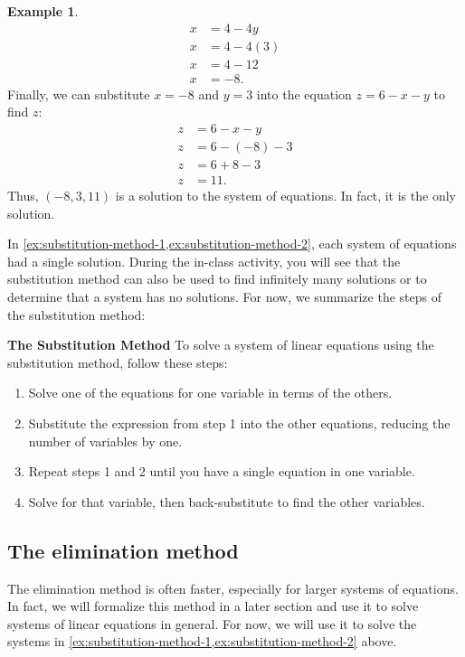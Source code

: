 \documentclass{article}
\theoremstyle{definition}
\newtheorem{example}{Example}
\newcounter{calloutbox}
\begin{document}
\begin{example}
\begin{align*}
    x&=4-4y \\
    x&=4-4(3) \\
    x&=4-12 \\
    x&=-8.
\end{align*}
Finally, we can substitute \(x=-8\) and \(y=3\) into the equation \(z=6-x-y\) to find \(z\):
\begin{align*}
    z&=6-x-y \\
    z&=6-(-8)-3 \\
    z&=6+8-3 \\
    z&=11.
\end{align*}
Thus, \((-8, 3, 11)\) is a solution to the system of equations. In fact, it is the only solution.
\end{example}

In \cref{ex:substitution-method-1,ex:substitution-method-2}, each system of equations had a single solution. During the in-class activity, you will see that the substitution method can also be used to find infinitely many solutions or to determine that a system has no solutions. For now, we summarize the steps of the substitution method:
\begin{calloutbox}\label{box:substitution-method}
    \textbf{The Substitution Method} To solve a system of linear equations using the substitution method, follow these steps:
    \begin{enumerate}
        \item Solve one of the equations for one variable in terms of the others.
        \item Substitute the expression from step 1 into the other equations, reducing the number of variables by one.
        \item Repeat steps 1 and 2 until you have a single equation in one variable.
        \item Solve for that variable, then back-substitute to find the other variables.
    \end{enumerate}
\end{calloutbox}

\subsection*{The elimination method}\label{subsec:elimination-method}

The elimination method is often faster, especially for larger systems of equations. In fact, we will formalize this method in a later section and use it to solve systems of linear equations in general. For now, we will use it to solve the systems in \cref{ex:substitution-method-1,ex:substitution-method-2} above.
\end{document}
